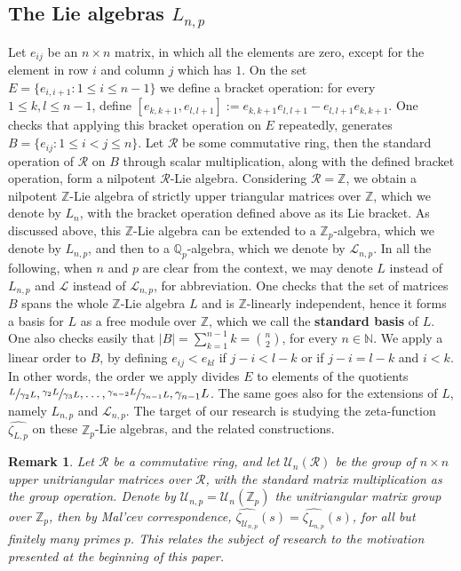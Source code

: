 \documentclass[12pt]{article}
\newtheorem{remark}[theorem]{Remark}
\begin{document}
\subsection{The Lie algebras $L_{n,p}$}
Let $e_{ij}$ be an $n\times{n}$ matrix, in which all the elements are zero, except for the element in row $i$ and column $j$ which has $1$. On the set $E=\{e_{i,i+1} : 1\leq{i}\leq{n-1}\}$ we define a bracket operation: for every $1\leq{k,l}\leq{n-1}$, define $[e_{k,k+1},e_{l,l+1}]:=e_{k,k+1}e_{l,l+1}-e_{l,l+1}e_{k,k+1}$. One checks that applying this bracket operation on $E$ repeatedly, generates $B=\{e_{ij} : 1\leq{i}<{j}\leq{n}\}$. Let $\mathcal{R}$ be some commutative ring, then the standard operation of $\mathcal{R}$ on $B$ through scalar multiplication, along with the defined bracket operation, form a nilpotent $\mathcal{R}$-Lie algebra. Considering $\mathcal{R}=\mathbb{Z}$, we obtain a nilpotent $\mathbb{Z}$-Lie algebra of strictly upper triangular matrices over $\mathbb{Z}$, which we denote by $L_{n}$, with the bracket operation defined above as its Lie bracket. As discussed above, this $\mathbb{Z}$-Lie algebra can be extended to a $\mathbb{Z}_p$-algebra, which we denote by $L_{n,p}$, and then to a $\mathbb{Q}_p$-algebra, which we denote by $\mathcal{L}_{n,p}$. In all the following, when $n$ and $p$ are clear from the context, we may denote $L$ instead of $L_{n,p}$ and $\mathcal{L}$ instead of $\mathcal{L}_{n,p}$, for abbreviation.
One checks that the set of matrices $B$ spans the whole $\mathbb{Z}$-Lie algebra $L$ and is $\mathbb{Z}$-linearly independent, hence it forms a basis for $L$ as a free module over $\mathbb{Z}$, which we call the \textbf{standard basis} of $L$. One also checks easily that $|B|=\sum_{k=1}^{n-1}k=\binom{n}{2}$, for every $n\in\mathbb{N}$. We apply a linear order to $B$, by defining $e_{ij}<e_{kl}$ if $j-i<l-k$ or if $j-i=l-k$ and $i<k$. In other words, the order we apply divides $E$ to elements of the quotients $\sfrac{L}{\gamma_2{L}},\sfrac{\gamma_2{L}}{\gamma_3{L}},\dots,\sfrac{\gamma_{n-2}{L}}{\gamma_{n-1}{L}},\gamma_{n-1}{L}$. The same goes also for the extensions of $L$, namely $L_{n,p}$ and $\mathcal{L}_{n,p}$. The target of our research is studying the zeta-function $\hat{\zeta_{L,p}}$ on these $\mathbb{Z}_p$-Lie algebras, and the related constructions.
\begin{remark}
Let $\mathcal{R}$ be a commutative ring, and let $\mathcal{U}_n(\mathcal{R})$ be the group of $n\times{n}$ upper unitriangular matrices over $\mathcal{R}$, with the standard matrix multiplication as the group operation. Denote by $\mathcal{U}_{n,p}=\mathcal{U}_n(\mathbb{Z}_p)$ the unitriangular matrix group over $\mathbb{Z}_p$, then by Mal'cev correspondence, $\hat{\zeta_{\mathcal{U}_{n,p}}}(s)=\hat{\zeta_{L_{n,p}}}(s)$, for all but finitely many primes $p$. This relates the subject of research to the motivation presented at the beginning of this paper.
\end{remark}
\end{document}
